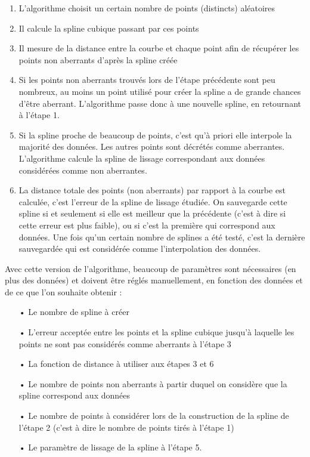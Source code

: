 \documentclass[a4paper,12pt]{article} %
\begin{document}
                    \begin{enumerate}
                    \item
                    L'algorithme choisit un certain nombre de points (distincts) aléatoires
                    \item
                    Il calcule la spline cubique passant par ces points 
                    \item
                    Il mesure de la distance entre la courbe et chaque point afin de récupérer les points non aberrants d'après la spline créée
                    \item
                    Si les points non aberrants trouvés lors de l'étape précédente sont peu nombreux, au moins un point utilisé pour créer la spline a de grande chances d'être aberrant. L'algorithme passe donc à une nouvelle spline, en retournant à l'étape 1.
                    \item
                    Si la spline proche de beaucoup de points, c'est qu'à priori elle interpole la majorité des données. Les autres points sont décrétés comme aberrantes.  L'algorithme calcule la spline de lissage correspondant aux données considérées comme non aberrantes.
                    \item
                    La distance totale des points (non aberrants) par rapport à la courbe est calculée, c'est l'erreur de la spline de lissage étudiée. On sauvegarde cette spline si et seulement si elle est meilleur que la précédente (c'est à dire si cette erreur est plus faible), ou si c'est la première qui correspond aux données.
                    Une fois qu'un certain nombre de splines a été testé, c'est la dernière sauvegardée qui est considérée comme l'interpolation des données.
                    \end{enumerate} 
                    
                    
                    Avec cette version de l'algorithme, beaucoup de paramètres sont nécessaires (en plus des données) et doivent être réglés manuellement, en fonction des données et de ce que l'on souhaite obtenir :
                    \begin{itemize}
                    \item[•] Le nombre de spline à créer
                    \item[•]  L'erreur acceptée entre les points et la spline cubique jusqu'à laquelle les points ne sont pas considérés comme aberrants à l'étape 3
                    \item[•]  La fonction de distance à utiliser aux étapes 3 et 6
                    \item[•] Le nombre de points non aberrants à partir duquel on considère que la spline correspond aux données
                    \item[•]  Le nombre de points à considérer lors de la construction de la spline de l'étape 2 (c'est à dire le nombre de points tirés à l'étape 1)
                    \item[•] Le paramètre de lissage de la spline à l'étape 5.
                    \end{itemize}
                    
\end{document}
